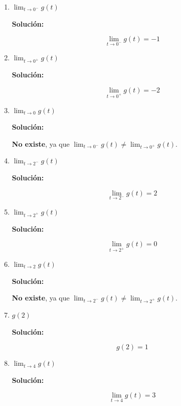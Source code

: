 \documentclass[12pt]{article}
\newcommand{\solucion}{%
    \vspace{0.8em}%
    \textbf{Solución:}%
}
\begin{document}
\begin{enumerate}[label=\roman*.]
    \item $\displaystyle\lim_{t \to 0^-} g(t)$

    \solucion

    \[
        \lim_{t \to 0^-} g(t) = -1
    \]

    \item $\displaystyle\lim_{t \to 0^+} g(t)$

    \solucion

    \[
        \lim_{t \to 0^+} g(t) = -2
    \]

    \item $\displaystyle\lim_{t \to 0} g(t)$

    \solucion

    \textbf{No existe}, ya que $\displaystyle\lim_{t \to 0^-} g(t) \neq \lim_{t \to 0^+} g(t)$.

    \item $\displaystyle\lim_{t \to 2^-} g(t)$

    \solucion

    \[
        \lim_{t \to 2^-} g(t) = 2
    \]

    \item $\displaystyle\lim_{t \to 2^+} g(t)$

    \solucion

    \[
        \lim_{t \to 2^+} g(t) = 0
    \]

    \item $\displaystyle\lim_{t \to 2} g(t)$

    \solucion

    \textbf{No existe}, ya que $\displaystyle\lim_{t \to 2^-} g(t) \neq \lim_{t \to 2^+} g(t)$.

    \item $g(2)$

    \solucion

    \[
        g(2) = 1
    \]

    \item $\displaystyle\lim_{t \to 4} g(t)$

    \solucion

    \[
        \lim_{t \to 4} g(t) = 3
    \]
\end{enumerate}
\end{document}
